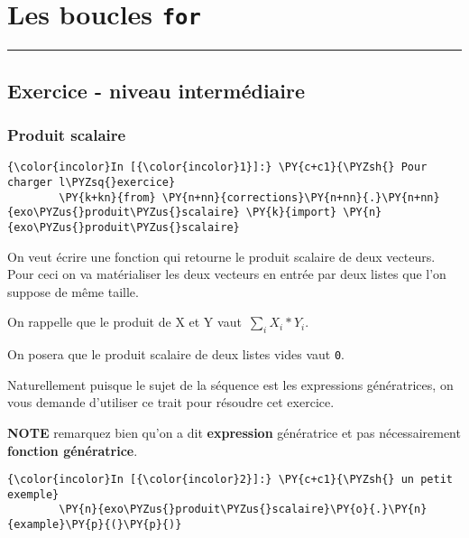     
    
    
    

    

    \hypertarget{les-boucles-for}{%
\section{\texorpdfstring{Les boucles
\texttt{for}}{Les boucles for}}\label{les-boucles-for}}

    \begin{center}\rule{0.5\linewidth}{\linethickness}\end{center}

    \hypertarget{exercice---niveau-intermuxe9diaire}{%
\subsection{Exercice - niveau
intermédiaire}\label{exercice---niveau-intermuxe9diaire}}

    \hypertarget{produit-scalaire}{%
\subsubsection{Produit scalaire}\label{produit-scalaire}}

    \begin{Verbatim}[commandchars=\\\{\}]
{\color{incolor}In [{\color{incolor}1}]:} \PY{c+c1}{\PYZsh{} Pour charger l\PYZsq{}exercice}
        \PY{k+kn}{from} \PY{n+nn}{corrections}\PY{n+nn}{.}\PY{n+nn}{exo\PYZus{}produit\PYZus{}scalaire} \PY{k}{import} \PY{n}{exo\PYZus{}produit\PYZus{}scalaire}
\end{Verbatim}


    On veut écrire une fonction qui retourne le produit scalaire de deux
vecteurs. Pour ceci on va matérialiser les deux vecteurs en entrée par
deux listes que l'on suppose de même taille.

On rappelle que le produit de X et Y vaut~\(\sum_{i} X_i * Y_i\).

On posera que le produit scalaire de deux listes vides vaut \texttt{0}.

    Naturellement puisque le sujet de la séquence est les expressions
génératrices, on vous demande d'utiliser ce trait pour résoudre cet
exercice.

\textbf{NOTE} remarquez bien qu'on a dit \textbf{expression} génératrice
et pas nécessairement \textbf{fonction génératrice}.

    \begin{Verbatim}[commandchars=\\\{\}]
{\color{incolor}In [{\color{incolor}2}]:} \PY{c+c1}{\PYZsh{} un petit exemple}
        \PY{n}{exo\PYZus{}produit\PYZus{}scalaire}\PY{o}{.}\PY{n}{example}\PY{p}{(}\PY{p}{)}
\end{Verbatim}


